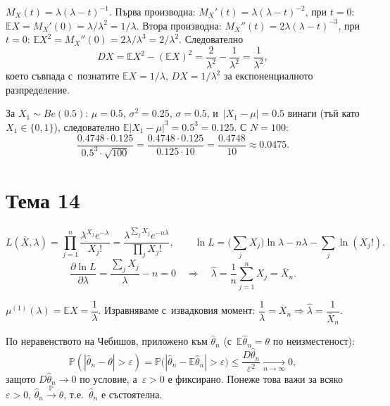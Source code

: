 \begin{proofbox}
$M_X(t)=\lambda(\lambda-t)^{-1}$. Първа производна: $M_X'(t)=
\lambda(\lambda-t)^{-2}$, при $t=0$: $\mathbb EX=M_X'(0)=\lambda/
\lambda^2=1/\lambda$. Втора производна: $M_X''(t)=2\lambda(\lambda-t)
^{-3}$, при $t=0$: $\mathbb EX^2=M_X''(0)=2\lambda/\lambda^3=2/
\lambda^2$. Следователно
\[
  DX = \mathbb EX^2-(\mathbb EX)^2 = \frac2{\lambda^2}-\frac1{
  \lambda^2} = \frac1{\lambda^2},
\]
което съвпада с~познатите $\mathbb EX=1/\lambda$, $DX=1/\lambda^2$
за експоненциалното разпределение.
\end{proofbox}

\begin{proofbox}
За $X_1\sim Be(0.5)$: $\mu=0.5$, $\sigma^2=0.25$, $\sigma=0.5$, и~$|X_1-\mu|=0.5$ винаги (тъй като $X_1\in\{0,1\}$), следователно
$\mathbb E|X_1-\mu|^3 = 0.5^3=0.125$. С $N=100$:
\[
  \frac{0.4748\cdot0.125}{0.5^3\cdot\sqrt{100}} = \frac{0.4748\cdot
  0.125}{0.125\cdot10} = \frac{0.4748}{10} \approx 0.0475.
\]
\end{proofbox}

\section*{Тема 14}

\begin{proofbox}
\[
  L(\bar X,\lambda) = \prod_{j=1}^n \frac{\lambda^{X_j}e^{-\lambda}}
  {X_j!} = \frac{\lambda^{\sum_jX_j}e^{-n\lambda}}{\prod_jX_j!},
  \qquad \ln L = \Big(\sum_jX_j\Big)\ln\lambda - n\lambda - \sum_j
  \ln(X_j!).
\]
\[
  \frac{\partial\ln L}{\partial\lambda} = \frac{\sum_jX_j}\lambda -
  n = 0 \quad\Longrightarrow\quad \hat\lambda = \frac1n\sum_{j=1}^n
  X_j = \overline X_n.
\]
\end{proofbox}

\begin{proofbox}
$\mu^{(1)}(\lambda)=\mathbb EX=\dfrac1\lambda$. Изравняваме с~извадковия момент: $\dfrac1\lambda=\overline X_n \Rightarrow
\hat\lambda = \dfrac1{\overline X_n}$.
\end{proofbox}

\begin{proofbox}
По неравенството на Чебишов, приложено към $\hat\theta_n$ (с~$\mathbb
E\hat\theta_n=\theta$ по неизместеност):
\[
  \mathbb P(|\hat\theta_n-\theta|>\varepsilon) = \mathbb P\big(|
  \hat\theta_n-\mathbb E\hat\theta_n|>\varepsilon\big) \le \frac{
  D\hat\theta_n}{\varepsilon^2} \xrightarrow[n\to\infty]{} 0,
\]
защото $D\hat\theta_n\to0$ по условие, а~$\varepsilon>0$ е
фиксирано. Понеже това важи за всяко $\varepsilon>0$, $\hat\theta_n
\xrightarrow{\mathbb P}\theta$, т.е.\ $\hat\theta_n$ е състоятелна.
\qedbg
\end{proofbox}

